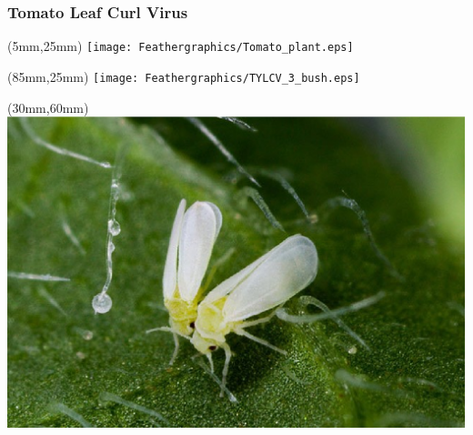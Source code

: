 \begin{frame}
	\frametitle{Tomato Leaf Curl Virus}
		\begin{textblock*}{40mm}(5mm,25mm)
			\texttt{[image: Feathergraphics/Tomato\_plant.eps]}
		\end{textblock*}
	
		\begin{textblock*}{30mm}(85mm,25mm)
			\texttt{[image: Feathergraphics/TYLCV\_3\_bush.eps]}
		\end{textblock*}
	{	
		\begin{textblock*}{45mm}(30mm,60mm)
			\includegraphics[width=\linewidth]{Feathergraphics/Mosca_Blanca.eps}
		\end{textblock*}
	}
\end{frame}
